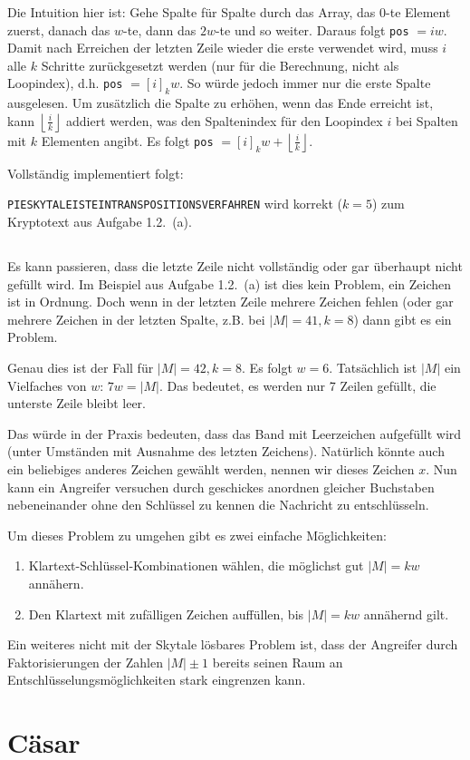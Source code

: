 \documentclass{../crypto}
\begin{document}
Die Intuition hier ist: Gehe Spalte für Spalte durch das Array, das $0$-te Element zuerst, danach das $w$-te, dann das $2w$-te und so weiter. Daraus folgt \texttt{pos} $= iw$. Damit nach Erreichen der letzten Zeile wieder die erste verwendet wird, muss $i$ alle $k$ Schritte zurückgesetzt werden (nur für die Berechnung, nicht als Loopindex), d.h. \texttt{pos} $= \left[i\right]_kw$. So würde jedoch immer nur die erste Spalte ausgelesen. Um zusätzlich die Spalte zu erhöhen, wenn das Ende erreicht ist, kann $\left\lfloor\frac{i}{k}\right\rfloor$ addiert werden, was den Spaltenindex für den Loopindex $i$ bei Spalten mit $k$ Elementen angibt. Es folgt \texttt{pos} $ = \left[i\right]_kw + \left\lfloor\frac{i}{k}\right\rfloor$.

Vollständig implementiert folgt:

\texttt{PIESKYTALEISTEINTRANSPOSITIONSVERFAHREN} wird korrekt ($k=5$) zum Kryptotext aus Aufgabe 1.2.~(a).

\subsection{}
Es kann passieren, dass die letzte Zeile nicht vollständig oder gar überhaupt nicht gefüllt wird. Im Beispiel aus Aufgabe 1.2.~(a) ist dies kein Problem, ein Zeichen ist in Ordnung.
Doch wenn in der letzten Zeile mehrere Zeichen fehlen (oder gar mehrere Zeichen in der letzten Spalte, z.B. bei $|M|=41, k=8$) dann gibt es ein Problem.

Genau dies ist der Fall für $|M|=42, k=8$. Es folgt $w=6$. Tatsächlich ist $|M|$ ein Vielfaches von $w$: $7w=|M|$. Das bedeutet, es werden nur 7 Zeilen gefüllt, die unterste
Zeile bleibt leer.

Das würde in der Praxis bedeuten, dass das Band mit Leerzeichen aufgefüllt wird (unter Umständen mit Ausnahme des letzten Zeichens). Natürlich könnte auch ein beliebiges anderes Zeichen gewählt werden, nennen wir dieses Zeichen $x$. Nun kann ein Angreifer versuchen durch geschickes anordnen gleicher Buchstaben nebeneinander ohne den Schlüssel zu kennen die Nachricht zu entschlüsseln.

Um dieses Problem zu umgehen gibt es zwei einfache Möglichkeiten:

\begin{enumerate}
	\item Klartext-Schlüssel-Kombinationen wählen, die möglichst gut $|M|=kw$ annähern.
  \item Den Klartext mit zufälligen Zeichen auffüllen, bis $|M|=kw$ annähernd gilt.
\end{enumerate}

Ein weiteres nicht mit der Skytale lösbares Problem ist, dass der Angreifer durch Faktorisierungen der Zahlen $|M| \pm 1$ bereits seinen Raum an Entschlüsselungsmöglichkeiten stark eingrenzen kann.


\section{Cäsar\protect\raisebox{1ex}{\normalfont\tiny 2}}

\subsection{}

\subsection{}
\end{document}
